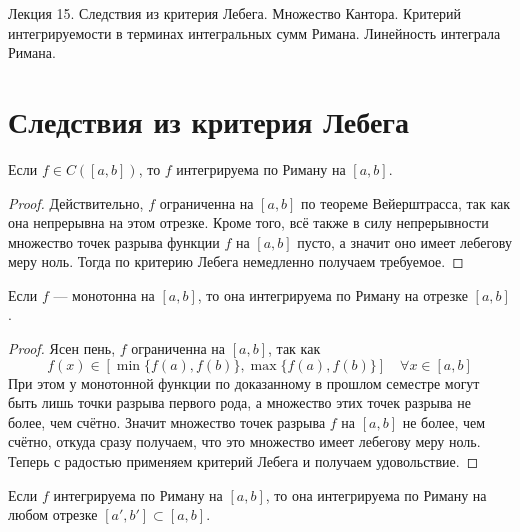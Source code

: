 \documentclass[11pt]{article}
\begin{document}
\begin{titlepage}
    \centering
    \vspace*{\fill}  %

    {\Huge Лекция 15. Следствия из критерия Лебега. Множество Кантора. Критерий интегрируемости в терминах интегральных сумм Римана. Линейность интеграла Римана.
    \par}

    \vspace*{\fill}  %
\end{titlepage}

\setcounter{page}{1}

\section{Следствия из критерия Лебега}

\begin{theorem}
    Если $f \in C([a, b])$, то $f$ интегрируема по Риману на $[a, b]$.
\end{theorem}

\begin{proof}
    Действительно, $f$ ограниченна на $[a, b]$ по теореме Вейерштрасса, так как она непрерывна на этом отрезке. Кроме того, всё также в силу непрерывности множество точек разрыва функции $f$ на $[a, b]$ пусто, а значит оно имеет лебегову меру ноль. Тогда по критерию Лебега немедленно получаем требуемое.
\end{proof}

\begin{theorem}
    Если $f$ --- монотонна на $[a, b]$, то она интегрируема по Риману на отрезке $[a, b]$.
\end{theorem}

\begin{proof}
    Ясен пень, $f$ ограниченна на $[a, b]$, так как 
    \[f(x) \in [\min\{f(a), f(b)\}, \max\{f(a), f(b)\}] \quad \forall x \in [a, b]\]
    При этом у монотонной функции по доказанному в прошлом семестре могут быть лишь точки разрыва первого рода, а множество этих точек разрыва не более, чем счётно. Значит множество точек разрыва $f$ на $[a, b]$ не более, чем счётно, откуда сразу получаем, что это множество имеет лебегову меру ноль. Теперь с радостью применяем критерий Лебега и получаем удовольствие.
\end{proof}

\begin{theorem}
    Если $f$ интегрируема по Риману на $[a, b]$, то она интегрируема по Риману на любом отрезке $[a', b'] \subset [a, b]$.
\end{theorem}
\end{document}
